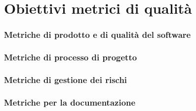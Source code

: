 \section{Obiettivi metrici di qualità}
\subsubsection{Metriche di prodotto e di qualità del software}



\subsubsection{Metriche di processo di progetto}


\subsubsection{Metriche di gestione dei rischi}


\subsubsection{Metriche per la documentazione}
